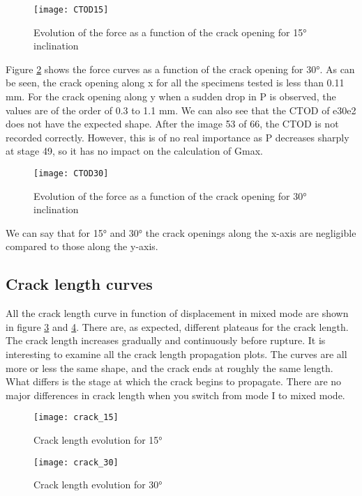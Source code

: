 \begin{figure}[H]
	\centering
	\texttt{[image: CTOD15]}
	\caption{Evolution of the force as a function of the crack opening for 15° inclination}
	\label{fig:CTOD15}
\end{figure}

Figure \ref{fig:CTOD30} shows the force curves as a function of the crack opening for 30°. As can be seen, the crack opening along x for all the specimens tested is less than 0.11 mm. For the crack opening along y when a sudden drop in P is observed, the values are of the order of 0.3 to 1.1 mm. 
We can also see that the CTOD of e30e2 does not have the expected shape. After the image 53 of 66, the CTOD is not recorded correctly. However, this is of no real importance as P decreases sharply at stage 49, so it has no impact on the calculation of Gmax.

\begin{figure}[H]
	\centering
	\texttt{[image: CTOD30]}
	\caption{Evolution of the force as a function of the crack opening for 30° inclination}
	\label{fig:CTOD30}
\end{figure}

We can say that for 15° and 30° the crack openings along the x-axis are negligible compared to those along the y-axis. 

\subsection{Crack length curves}

All the crack length curve in function of displacement in mixed mode are shown in figure \ref{fig:crack_15} and \ref{fig:crack_30}. 
There are, as expected, different plateaus for the crack length. The crack length increases gradually and continuously before rupture. It is interesting to examine all the crack length propagation plots.  The curves are all more or less the same shape, and the crack ends at roughly the same length. What differs is the stage at which the crack begins to propagate. There are no major differences in crack length when you switch from mode I to mixed mode.

\begin{figure}[htp]
	\centering
	\texttt{[image: crack\_15]}
	\caption{Crack length evolution for 15°}
	\label{fig:crack_15}
\end{figure}

\begin{figure}[htp]
	\centering
	\texttt{[image: crack\_30]}
	\caption{Crack length evolution for 30°}
	\label{fig:crack_30}
\end{figure}

